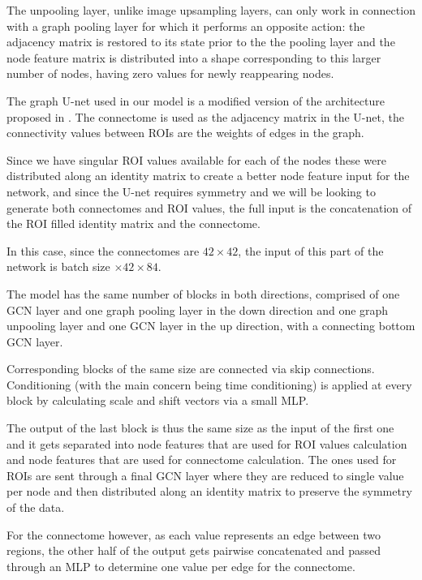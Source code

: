 	
	The unpooling layer, unlike image upsampling layers, can only work in connection with a graph pooling layer for which it performs an opposite action: the adjacency matrix is restored to its state prior to the the pooling layer and the node feature matrix is distributed into a shape corresponding to this larger number of nodes, having zero values for newly reappearing nodes.
	
	The graph U-net used in our model is a modified version of the architecture proposed in \cite{graph-u-net}. The connectome is used as the adjacency matrix in the U-net, the connectivity values between ROIs are the weights of edges in the graph. 
	
	Since we have singular ROI values available for each of the nodes these were distributed along an identity matrix to create a better node feature input for the network, and since the U-net requires symmetry and we will be looking to generate both connectomes and ROI values, the full input is the concatenation of the ROI filled identity matrix and the connectome. 
	
	In this case, since the connectomes are $42 \times 42$, the input of this part of the network is batch size $\times 42 \times 84$.
	
	
	The model has the same number of blocks in both directions, comprised of one GCN layer and one graph pooling layer in the down direction and one graph unpooling layer and one GCN layer in the up direction, with a connecting bottom GCN layer. 
	
	Corresponding blocks of the same size are connected via skip connections. Conditioning (with the main concern being time conditioning) is applied at every block by calculating scale and shift vectors via a small MLP.
	
	
	The output of the last block is thus the same size as the input of the first one and it gets separated into node features that are used for ROI values calculation and node features that are used for connectome calculation. The ones used for ROIs are sent through a final GCN layer where they are reduced to single value per node and then distributed along an identity matrix to preserve the symmetry of the data. 
	
	For the connectome however, as each value represents an edge between two regions, the other half of the output gets pairwise concatenated and passed through an MLP to determine one value per edge for the connectome.
	
